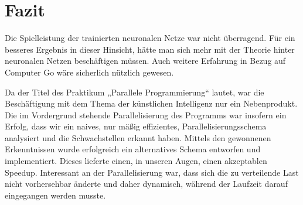 \section{Fazit}

Die Spielleistung der trainierten neuronalen Netze war nicht überragend. Für
ein besseres Ergebnis in dieser Hinsicht, hätte man sich mehr mit der Theorie
hinter neuronalen Netzen beschäftigen müssen. Auch weitere Erfahrung in Bezug
auf Computer Go wäre sicherlich nützlich gewesen.

Da der Titel des Praktikum „Parallele Programmierung“ lautet, war die
Beschäftigung mit dem Thema der künstlichen Intelligenz nur ein Nebenprodukt.
Die im Vordergrund stehende Parallelisierung des Programms war insofern ein
Erfolg, dass wir ein naives, nur mäßig effizientes, Parallelisierungsschema
analysiert und die Schwachstellen erkannt haben.  Mittels den gewonnenen
Erkenntnissen wurde erfolgreich ein alternatives Schema entworfen und
implementiert. Dieses lieferte einen, in unseren Augen, einen akzeptablen
Speedup. Interessant an der Parallelisierung war, dass sich die zu verteilende
Last nicht vorhersehbar änderte und daher dynamisch, während der Laufzeit
darauf eingegangen werden musste.
